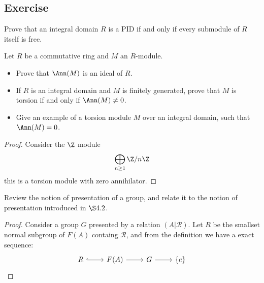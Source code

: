 \subsection{Exercise}
\begin{exercise}
Prove that an integral domain $R$ is a PID if and only if every submodule of $R$ itself is free. 
\end{exercise}
\begin{exercise}
Let $R$ be a commutative ring and $M$ an $R$-module.
\begin{itemize}
\item Prove that $\Ann(M)$ is an ideal of $R$.
\item If $R$ is an integral domain and $M$ is finitely generated, prove that $M$ is torsion if and only if $\Ann(M)\neq0$.
\item Give an example of a torsion module $M$ over an integral domain, such that $\Ann(M)=0$.
\end{itemize}
\end{exercise}
\begin{proof}
Consider the $\Z$ module 
\[\bigoplus_{n\geq 1}\Z/n\Z\]
this is a torsion module with zero annihilator.
\end{proof}
\begin{exercise}
Review the notion of presentation of a group, and relate it to the notion of presentation introduced in $\S4.2$.
\end{exercise}
\begin{proof}
Consider a group $G$ presented by a relation $(A|\mathscr{R})$. Let $R$ be the smallset normal subgroup of $F(A)$ containg $\mathscr{R}$, and from the definition we have a exact sequence:
\[\begin{tikzcd}
R\ar[r,hook]&F(A)\ar[r]&G\ar[r]&\{e\}
\end{tikzcd}\]
\end{proof}
